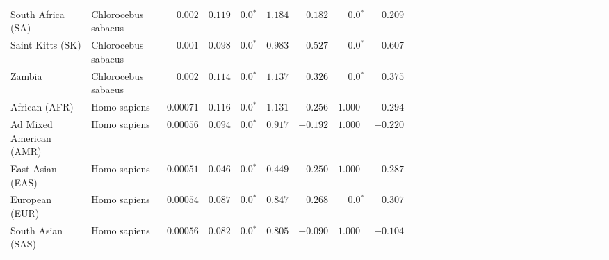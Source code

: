 \begin{center}
\begin{adjustbox}{width = 1\textwidth}
\begin{tabular}{|l|l|r|r|r|r|r|r|r|r|r|r|r|r|r|r|r|r|r|r|r|r|r|r|r|r|r|r|r|}
              South Africa (SA) &  Chlorocebus sabaeus &           $ 0.002$ &                      $ 0.119$ &                  $\bm{0.0{^*}}$ &                                           $ 1.184$ &                      $ 0.182$ &                  $\bm{0.0{^*}}$ &                                           $ 0.209$ \\
               Saint Kitts (SK) &  Chlorocebus sabaeus &           $ 0.001$ &                      $ 0.098$ &                  $\bm{0.0{^*}}$ &                                           $ 0.983$ &                      $ 0.527$ &                  $\bm{0.0{^*}}$ &                                           $ 0.607$ \\
                         Zambia &  Chlorocebus sabaeus &           $ 0.002$ &                      $ 0.114$ &                  $\bm{0.0{^*}}$ &                                           $ 1.137$ &                      $ 0.326$ &                  $\bm{0.0{^*}}$ &                                           $ 0.375$ \\
                  African (AFR) &         Homo sapiens &          $0.00071$ &                      $ 0.116$ &                  $\bm{0.0{^*}}$ &                                           $ 1.131$ &                      $-0.256$ &                      $ 1.000~~$ &                                           $-0.294$ \\
        Ad Mixed American (AMR) &         Homo sapiens &          $0.00056$ &                      $ 0.094$ &                  $\bm{0.0{^*}}$ &                                           $ 0.917$ &                      $-0.192$ &                      $ 1.000~~$ &                                           $-0.220$ \\
               East Asian (EAS) &         Homo sapiens &          $0.00051$ &                      $ 0.046$ &                  $\bm{0.0{^*}}$ &                                           $ 0.449$ &                      $-0.250$ &                      $ 1.000~~$ &                                           $-0.287$ \\
                 European (EUR) &         Homo sapiens &          $0.00054$ &                      $ 0.087$ &                  $\bm{0.0{^*}}$ &                                           $ 0.847$ &                      $ 0.268$ &                  $\bm{0.0{^*}}$ &                                           $ 0.307$ \\
              South Asian (SAS) &         Homo sapiens &          $0.00056$ &                      $ 0.082$ &                  $\bm{0.0{^*}}$ &                                           $ 0.805$ &                      $-0.090$ &                      $ 1.000~~$ &                                           $-0.104$ \\
\bottomrule
\end{tabular}
\end{adjustbox}
\end{center}
\newpage
